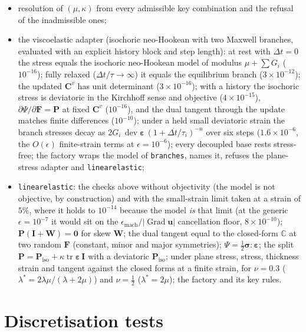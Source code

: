 \documentclass[11pt]{article}
\newcommand{\Grad}{\operatorname{Grad}}
\newcommand{\beps}{\bm{\varepsilon}}
\newcommand{\dev}{\operatorname{dev}}
\newcommand{\tr}{\operatorname{tr}}
\newcommand{\bu}{\bm{u}}
\newcommand{\bsig}{\bm{\sigma}}
\newcommand{\bP}{\bm{P}}
\newcommand{\bF}{\bm{F}}
\newcommand{\bC}{\bm{C}}
\newcommand{\bI}{\bm{I}}
\DeclareRobustCommand{\code}[1]{{\def\_{\textunderscore\allowbreak}\texttt{#1}}}
\begin{document}
\begin{itemize}[nosep]
    coupled models refuse it;
  \item resolution of $(\mu, \kappa)$ from every admissible key combination
    and the refusal of the inadmissible ones;
  \item the viscoelastic adapter (isochoric neo-Hookean with two Maxwell
    branches, evaluated with an explicit history block and step length): at
    rest with $\Delta t = 0$ the stress equals the isochoric neo-Hookean
    model of modulus $\mu + \sum G_i$ ($10^{-16}$); fully relaxed
    ($\Delta t/\tau \to \infty$) it equals the equilibrium branch
    ($3\times10^{-12}$); the updated $\bC^v$ has unit determinant
    ($3\times10^{-16}$); with a history the isochoric stress is deviatoric in
    the Kirchhoff sense and objective ($4\times10^{-15}$),
    $\partial\Psi/\partial\bF = \bP$ at fixed $\bC^v$ ($10^{-16}$), and the
    dual tangent through the update matches finite differences
    ($10^{-10}$); under a held small deviatoric strain the branch stresses
    decay as $2G_i\,\dev\beps\,(1 + \Delta t/\tau_i)^{-n}$ over six steps
    ($1.6\times10^{-6}$, the $O(\epsilon)$ finite-strain terms at
    $\epsilon = 10^{-6}$); every decoupled base rests stress-free; the
    factory wraps the model of \code{branches}, names it, refuses the
    plane-stress adapter and \code{linear\_elastic};
  \item \code{linear\_elastic}: the checks above without objectivity (the
    model is not objective, by construction) and with the small-strain limit
    taken at a strain of $5\%$, where it holds to $10^{-14}$ because the
    model \emph{is} that limit (at the generic $\epsilon = 10^{-7}$ it would
    sit on the $\epsilon_{\mathrm{mach}}/|\Grad\bu|$ cancellation floor,
    $8\times10^{-10}$); $\bP(\bI + \bm W) = \bm 0$ for skew $\bm W$; the dual
    tangent equal to the closed-form $\mathbb C$ at two random $\bF$
    (constant, minor and major symmetries); $\Psi = \tfrac12\bsig:\beps$; the
    split $\bP = \bP_{\mathrm{iso}} + \kappa\tr\beps\,\bI$ with a deviatoric
    $\bP_{\mathrm{iso}}$; under plane stress, stress, thickness strain and
    tangent against the closed forms at a finite strain, for $\nu = 0.3$
    ($\lambda^* = 2\lambda\mu/(\lambda + 2\mu)$) and $\nu = \tfrac12$
    ($\lambda^* = 2\mu$); the factory and its key rules.
\end{itemize}

\section{Discretisation tests}
\end{document}
